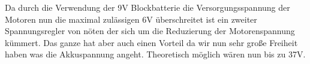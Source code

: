 \begin{flushleft}
    Da durch die Verwendung der 9V Blockbatterie die Versorgungsspannung der Motoren nun die maximal zulässigen 6V
    überschreitet ist ein zweiter Spannungsregler von nöten der sich um die Reduzierung der Motorenspannung kümmert.
    Das ganze hat aber auch einen Vorteil da wir nun sehr große Freiheit haben was die Akkuspannung angeht. Theoretisch möglich wären nun bis zu 37V.

\end{flushleft}